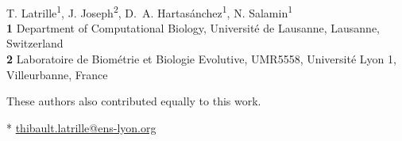 \documentclass[10pt,letterpaper]{article}
\begin{document}
\vspace*{0.2in}

\begin{flushleft}
{\Large
\textbf{} %
}
\newline
\\
T. {Latrille}\textsuperscript{1\ddag*},
J. {Joseph}\textsuperscript{2\ddag},
D.~A. {Hartasánchez}\textsuperscript{1},
N. {Salamin}\textsuperscript{1}
\\
\bigskip
\textbf{1} Department of Computational Biology, Université de Lausanne, Lausanne, Switzerland
\\
\textbf{2} Laboratoire de Biométrie et Biologie Evolutive, UMR5558, Université Lyon 1, Villeurbanne, France
\\

\bigskip

%
%

\ddag These authors also contributed equally to this work.



* \href{mailto:thibault.latrille@ens-lyon.org}{thibault.latrille@ens-lyon.org}

\end{flushleft}
\end{document}
